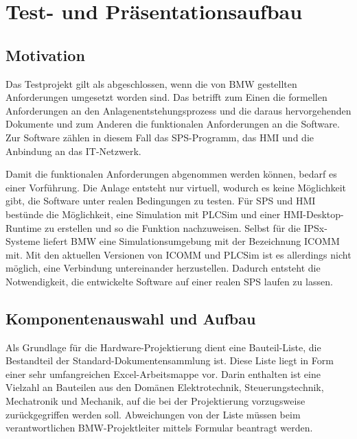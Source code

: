 

\chapter{Test- und Präsentationsaufbau}

\section{Motivation}
\label{sec:testingRackMotivation}

Das Testprojekt gilt als abgeschlossen, wenn die von BMW gestellten Anforderungen umgesetzt worden sind. Das betrifft zum Einen die formellen Anforderungen an den Anlagenentstehungsprozess und die daraus hervorgehenden Dokumente und zum Anderen die funktionalen Anforderungen an die Software. Zur Software zählen in diesem Fall das SPS-Programm, das HMI und die Anbindung an das IT-Netzwerk. 

Damit die funktionalen Anforderungen abgenommen werden können, bedarf es einer Vorführung. Die Anlage entsteht nur virtuell, wodurch es keine Möglichkeit gibt, die Software unter realen Bedingungen zu testen. Für SPS und HMI bestünde die Möglichkeit, eine Simulation mit PLCSim und einer HMI-Desktop-Runtime zu erstellen und so die Funktion nachzuweisen. Selbst für die IPSx-Systeme liefert BMW eine Simulationsumgebung mit der Bezeichnung ICOMM mit. Mit den aktuellen Versionen von ICOMM und PLCSim ist es allerdings nicht möglich, eine Verbindung untereinander herzustellen. Dadurch entsteht die Notwendigkeit, die entwickelte Software auf einer realen SPS laufen zu lassen.

\section{Komponentenauswahl und Aufbau}
\label{sec:componentsAndAssembly}

Als Grundlage für die Hardware-Projektierung dient eine Bauteil-Liste, die Bestandteil der Standard-Dokumentensammlung ist. Diese Liste liegt in Form einer sehr umfangreichen Excel-Arbeitsmappe vor. Darin enthalten ist eine Vielzahl an Bauteilen aus den Domänen Elektrotechnik, Steuerungstechnik, Mechatronik und Mechanik, auf die bei der Projektierung vorzugsweise zurückgegriffen werden soll. Abweichungen von der Liste müssen beim verantwortlichen BMW-Projektleiter mittels Formular beantragt werden.

